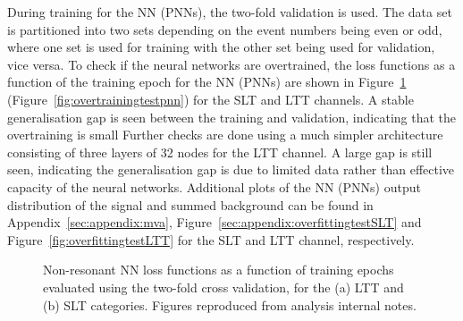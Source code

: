 During training for the NN (PNNs), the two-fold validation is used. 
The data set is partitioned into two sets depending on 
the event numbers being even or odd, where one set is used for
training with the other set being used for validation, vice versa.
To check if the neural networks are overtrained, 
the loss functions as a function of the training epoch for 
the NN (PNNs) are shown in Figure~\ref{fig:overtrainingtestnn} 
(Figure~\ref{fig:overtrainingtestpnn}) for the 
SLT and LTT channels. A stable generalisation gap is seen between 
the training and validation, indicating that the overtraining is small
Further checks are done using a much simpler architecture consisting of three layers
of 32 nodes for the LTT channel. A large gap is still seen, indicating the
generalisation gap is due to limited data rather than effective capacity of
the neural networks.
Additional plots of the NN (PNNs) output distribution of the signal and summed background
can be found in Appendix~\ref{sec:appendix:mva}, 
Figure~\ref{sec:appendix:overfittingtestSLT} and Figure~\ref{fig:overfittingtestLTT}
for the SLT and LTT channel, respectively. 

\begin{figure}
  \centering
  \quad
  \quad
  \caption{Non-resonant NN loss functions as a function of training epochs evaluated 
  using the two-fold cross validation, for the (a) LTT and (b) SLT categories. 
  Figures reproduced from analysis internal notes. 
  }
  \label{fig:overtrainingtestnn}
\end{figure}

